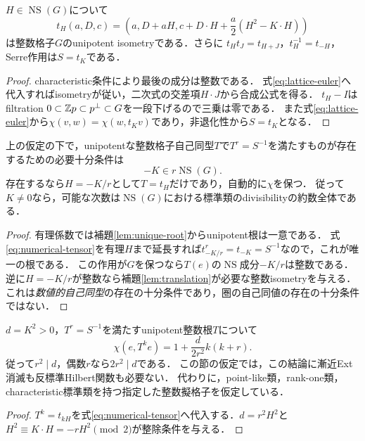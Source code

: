 \documentclass[11pt,a4paper]{ltjsarticle}
\begin{document}
\begin{lemma}[数値的tensor作用]\label{lem:translation}
$H\in\operatorname{NS}(G)$について
\begin{equation}\label{eq:numerical-tensor}
 t_H(a,D,c)=\left(a,D+aH,c+D\cdot H+\frac a2(H^2-K\cdot H)\right)
\end{equation}
は整数格子$G$のunipotent isometryである．さらに
$t_Ht_J=t_{H+J}$，$t_H^{-1}=t_{-H}$，Serre作用は$S=t_K$である．
\end{lemma}
\begin{proof}
characteristic条件により最後の成分は整数である．
式\eqref{eq:lattice-euler}へ代入すればisometryが従い，二次式の交差項$H\cdot J$から合成公式を得る．
$t_H-I$はfiltration $0\subset\mathbb Z p\subset p^\perp\subset G$を一段下げるので三乗は零である．
また式\eqref{eq:lattice-euler}から$\chi(v,w)=\chi(w,t_Kv)$であり，非退化性から$S=t_K$となる．
\end{proof}

\begin{theorem}[unipotentな数値根の完全判定]\label{thm:lattice-root}
上の仮定の下で，unipotentな整数格子自己同型$T$で$T^r=S^{-1}$を満たすものが存在するための必要十分条件は
\[
 \boxed{-K\in r\operatorname{NS}(G).}
\]
存在するなら$H=-K/r$として$T=t_H$だけであり，自動的に$\chi$を保つ．
従って$K\ne0$なら，可能な次数は$\operatorname{NS}(G)$における標準類のdivisibilityの約数全体である．
\end{theorem}
\begin{proof}
有理係数では補題\ref{lem:unique-root}からunipotent根は一意である．
式\eqref{eq:numerical-tensor}を有理$H$まで延長すれば$t_{-K/r}^r=t_{-K}=S^{-1}$なので，これが唯一の根である．
この作用が$G$を保つなら$T(e)$の$\operatorname{NS}$成分$-K/r$は整数である．
逆に$H=-K/r$が整数なら補題\ref{lem:translation}が必要な整数isometryを与える．
これは\emph{数値的自己同型}の存在の十分条件であり，圏の自己同値の存在の十分条件ではない．
\end{proof}

\begin{corollary}\label{cor:lattice-euler}
$d=K^2>0$，$T^r=S^{-1}$を満たすunipotent整数根$T$について
\[
 \chi(e,T^ke)=1+\frac{d}{2r^2}k(k+r).
\]
従って$r^2\mid d$，偶数$r$なら$2r^2\mid d$である．
この節の仮定では，この結論に漸近Ext消滅も反標準Hilbert関数も必要ない．
代わりに，point-like類，rank-one類，characteristic標準類を持つ指定した整数擬格子を仮定している．
\end{corollary}
\begin{proof}
$T^k=t_{kH}$を式\eqref{eq:numerical-tensor}へ代入する．$d=r^2H^2$と
$H^2\equiv K\cdot H=-rH^2\pmod2$が整除条件を与える．
\end{proof}
\end{document}
